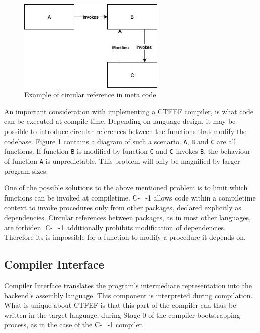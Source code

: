\begin{figure}
	\includegraphics[width=7cm]{pictures/circular-function-reference.jpg}
	\caption{Example of circular reference in meta code}
	\label{circular-function-reference}
\end{figure}

An important consideration with implementing a CTFEF compiler, is what code can be executed at compile-time.
Depending on language design, it may be possible to introduce circular references between the functions that modify the codebase.
Figure \ref{circular-function-reference} contains a diagram of such a scenario.
\lstinline{A}, \lstinline{B} and \lstinline{C} are all functions.
If function \lstinline{B} is modified by function \lstinline{C} and \lstinline{C} invokes \lstinline{B}, the behaviour of function \lstinline{A} is unpredictable.
This problem will only be magnified by larger program sizes.


One of the possible solutions to the above mentioned problem is to limit which functions can be invoked at compiletime.
C-=-1 allows code within a compiletime context to invoke procedures only from other packages, declared explicitly as dependencies.
Circular references between packages, as in most other languages, are forbiden.
C-=-1 additionally prohibits modification of dependencies.
Therefore its is impossible for a function to modify a procedure it depends on.

\subsection{Compiler Interface}
\label{compiler-interface}

Compiler Interface translates the program's intermediate representation into the backend's assembly language.
This component is interpreted during compilation.
What is unique about CTFEF is that this part of the compiler can thus be written in the target language, during Stage 0 of the compiler bootstrapping process, as in the case of the C-=-1 compiler\cite{puntambekar:compiler_design, novillo2007gcc, grabski2022compilation}.

